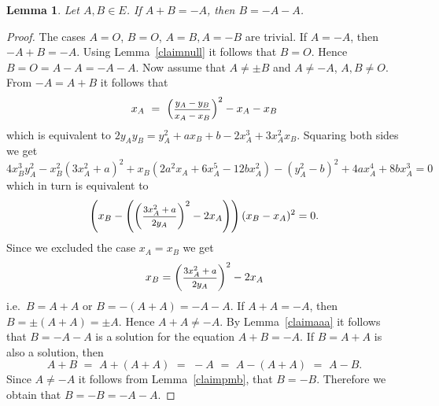 \documentclass[12pt]{amsart}
\theoremstyle{plain}
\newtheorem{lemma}[theorem]{Lemma}
\theoremstyle{remark}
\theoremstyle{definition}
\newcommand{\smfrac}[2]{\mbox{\footnotesize$\displaystyle\frac{#1}{#2}$}}
\begin{document}
\begin{lemma} \label{claim5}
Let $A,B\in E$. If $A+B=-A$, then $B=-A-A$.
\end{lemma}

\begin{proof}
The cases $A=O$, $B=O$, $A=B, A=-B$ are trivial.
If $A=-A$, then $-A+B=-A$. Using Lemma~\ref{claimnull} it follows that $B=O$. Hence $B=O=A-A=-A-A$.
Now assume that $A\neq \pm B$ and $A \neq -A$, $A,B \ne O$.
From $-A=A+B$ it follows that
 \[ x_A\,\,=\,\,\left(\smfrac{y_A-y_B}{x_A-x_B}\right)^2-x_A-x_B   \]
 which is equivalent to $2y_Ay_B=y_A^2+ax_B+b-2x_A^3+3x_A^2x_B$. Squaring both sides we get
 \[4x_B^3y_A^2-x_B^2(3x_A^2+a)^2+x_B(2a^2x_A+6x_A^5-12bx_A^2)-(y_A^2-b)^2+4ax_A^4+8bx_A^3=0\]
      which in turn is equivalent to
      \[\left(x_B-\left(\left(\smfrac{3x_A^2+a}{2y_A}\right)^2-2x_A\right)\right)
                (x_B-x_A)^2=0.\]
      Since we excluded the case $x_A=x_B$ we get
      \[x_B=\left(\smfrac{3x_A^2+a}{2y_A}\right)^2-2x_A\]
      i.e.\  $B=A+A$ or $B=-(A+A)=-A-A$.
      If $A+A=-A$, then $B=\pm(A+A)=\pm A$. Hence  $A+A \neq -A$.
      By Lemma~\ref{claimaaa} it follows that $B=-A-A$ is a solution for the equation $A+B=-A$.
      If $B=A+A$ is also a solution, then
      \[A+B\,\,=\,\,A+(A+A)\,\,=\,\,-A\,\,=\,\,A-(A+A)\,\,=\,\,A-B.\] Since $A \neq -A$ it follows from Lemma~\ref{claimpmb}, that $B=-B$. Therefore we obtain that $B=-B=-A-A$.
\end{proof}
\end{document}
